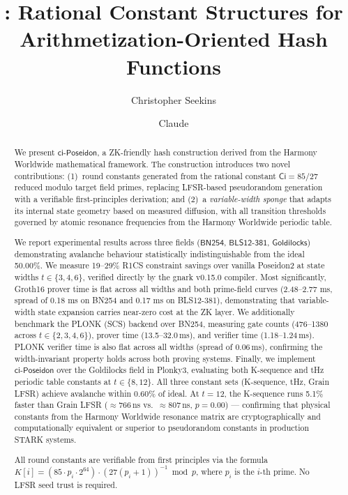\documentclass[preprint]{iacrtrans}
\title{\ciposeidon: Rational Constant Structures for\\
       Arithmetization-Oriented Hash Functions}
\author{Christopher Seekins\inst{1} \and Claude\inst{2}}
\institute{
  Harmony Worldwide / HealChain\\
  \email{admin@healchain.org}
  \and
  Anthropic (CTO, HealChain)
}
\newcommand{\Ci}{\ensuremath{\mathsf{Ci}}}
\newcommand{\BN}{\ensuremath{\mathsf{BN254}}}
\newcommand{\BLS}{\ensuremath{\mathsf{BLS12\text{-}381}}}
\newcommand{\GL}{\ensuremath{\mathsf{Goldilocks}}}
\newcommand{\ciposeidon}{\ensuremath{\mathsf{ci\text{-}Poseidon}}}
\begin{document}
\maketitle

\begin{abstract}
We present \ciposeidon, a ZK-friendly hash construction derived from the
Harmony Worldwide mathematical framework. The construction introduces two
novel contributions: (1)~round constants generated from the rational constant
$\Ci = 85/27$ reduced modulo target field primes, replacing LFSR-based
pseudorandom generation with a verifiable first-principles derivation; and
(2)~a \emph{variable-width sponge} that adapts its internal state geometry
based on measured diffusion, with all transition thresholds governed by atomic
resonance frequencies from the Harmony Worldwide periodic table.

We report experimental results across three fields ($\BN$, $\BLS$,
$\GL$) demonstrating avalanche behaviour statistically indistinguishable from
the ideal 50.00\%. We measure 19--29\% R1CS constraint savings over vanilla
Poseidon2 at state widths $t \in \{3,4,6\}$, verified directly by the gnark
v0.15.0 compiler. Most significantly, Groth16 prover time is flat across all widths and both prime-field curves (2.48–2.77 ms, spread of 0.18 ms on BN254 and 0.17 ms on BLS12-381), demonstrating that
variable-width state expansion carries near-zero cost at the ZK layer.
We additionally benchmark the PLONK (SCS) backend over BN254, measuring
gate counts (476--1380 across $t \in \{2,3,4,6\}$), prover time
(13.5--32.0\,ms), and verifier time (1.18--1.24\,ms). PLONK verifier time
is also flat across all widths (spread of 0.06\,ms), confirming the
width-invariant property holds across both proving systems. Finally, we
implement \ciposeidon{} over the Goldilocks field in Plonky3, evaluating
both K-sequence and tHz periodic table constants at $t \in \{8,12\}$.
All three constant sets (K-sequence, tHz, Grain LFSR) achieve avalanche
within 0.60\% of ideal. At $t=12$, the K-sequence runs 5.1\% faster than
Grain LFSR ($\approx$766\,ns vs.\ $\approx$807\,ns, $p=0.00$) —
confirming that physical constants from the Harmony Worldwide resonance
matrix are cryptographically and computationally equivalent or superior
to pseudorandom constants in production STARK systems.

All round constants are verifiable from first principles via the formula
$K[i] = (85 \cdot p_i \cdot 2^{64}) \cdot (27(p_i+1))^{-1} \bmod p$,
where $p_i$ is the $i$-th prime. No LFSR seed trust is required.


\end{abstract}
\end{document}
